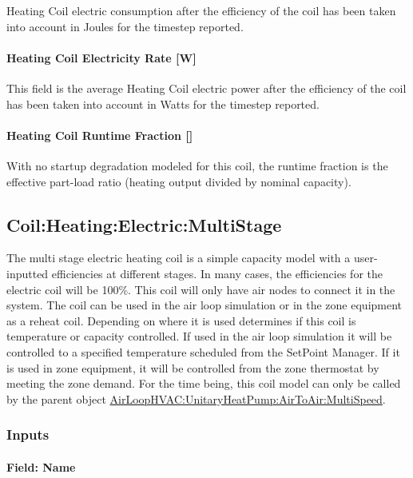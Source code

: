 Heating Coil electric consumption after the efficiency of the coil has been taken into account in Joules for the timestep reported.

\paragraph{Heating Coil Electricity Rate {[}W{]}}\label{heating-coil-electric-power-w}

This field is the average Heating Coil electric power after the efficiency of the coil has been taken into account in Watts for the timestep reported.

\paragraph{Heating Coil Runtime Fraction {[]}}\label{heating-coil-runtime-fraction-electric}

With no startup degradation modeled for this coil, the runtime fraction is the effective part-load ratio (heating output divided by nominal capacity).

\subsection{Coil:Heating:Electric:MultiStage}\label{coilheatingelectricmultistage}

The multi stage electric heating coil is a simple capacity model with a user-inputted efficiencies at different stages. In many cases, the efficiencies for the electric coil will be 100\%. This coil will only have air nodes to connect it in the system. The coil can be used in the air loop simulation or in the zone equipment as a reheat coil. Depending on where it is used determines if this coil is temperature or capacity controlled. If used in the air loop simulation it will be controlled to a specified temperature scheduled from the SetPoint Manager. If it is used in zone equipment, it will be controlled from the zone thermostat by meeting the zone demand. For the time being, this coil model can only be called by the parent object \hyperref[airloophvacunitaryheatpumpairtoairmultispeed]{AirLoopHVAC:UnitaryHeatPump:AirToAir:MultiSpeed}.

\subsubsection{Inputs}\label{inputs-4-015}

\paragraph{Field: Name}\label{field-name-4-012}

